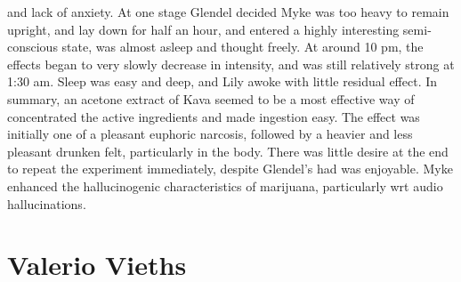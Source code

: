 \documentclass[12pt]{book}
\begin{document}
and lack of anxiety. At one stage Glendel decided Myke was too heavy to remain upright, and lay down for half an hour, and entered a highly interesting semi-conscious state, was almost asleep and thought freely. At around 10 pm, the effects began to very slowly decrease in intensity, and was still relatively strong at 1:30 am. Sleep was easy and deep, and Lily awoke with little residual effect. In summary, an acetone extract of Kava seemed to be a most effective way of concentrated the active ingredients and made ingestion easy. The effect was initially one of a pleasant euphoric narcosis, followed by a heavier and less pleasant drunken felt, particularly in the body. There was little desire at the end to repeat the experiment immediately, despite Glendel's had was enjoyable. Myke enhanced the hallucinogenic characteristics of marijuana, particularly wrt audio hallucinations.



\chapter{Valerio Vieths}
\end{document}
